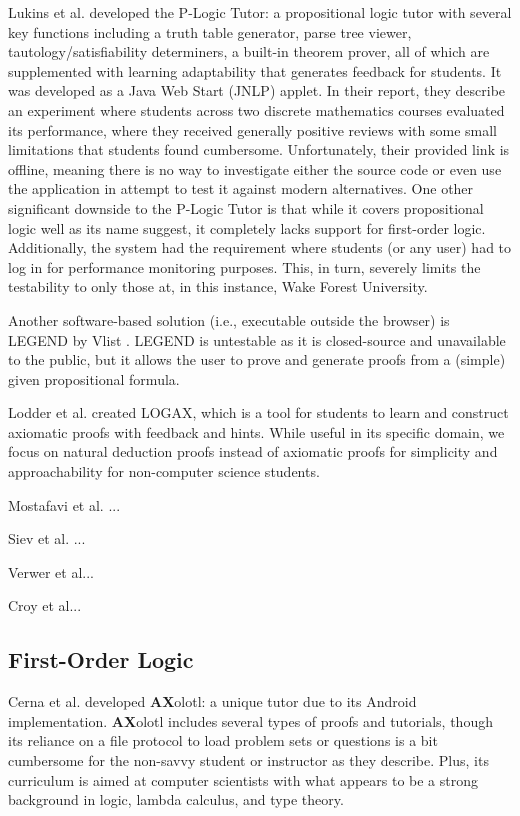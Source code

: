 \documentclass[ms]{uncgdissertationexp2}
\theoremstyle{plain}
\theoremstyle{definition}
\theoremstyle{remark}
\begin{document}
Lukins et al. \cite{lukins} developed the P-Logic Tutor: a propositional logic tutor with several key functions including a truth table generator, parse tree viewer, tautology/satisfiability determiners, a built-in theorem prover, all of which are supplemented with learning adaptability that generates feedback for students. It was developed as a Java Web Start (JNLP) applet. In their report, they describe an experiment where students across two discrete mathematics courses evaluated its performance, where they received generally positive reviews with some small limitations that students found cumbersome. Unfortunately, their provided link is offline, meaning there is no way to investigate either the source code or even use the application in attempt to test it against modern alternatives. One other significant downside to the P-Logic Tutor is that while it covers propositional logic well as its name suggest, it completely lacks support for first-order logic. Additionally, the system had the requirement where students (or any user) had to log in for performance monitoring purposes. This, in turn, severely limits the testability to only those at, in this instance, Wake Forest University. 

Another software-based solution (i.e., executable outside the browser) is LEGEND by Vlist \cite{vlist}. LEGEND is untestable as it is closed-source and unavailable to the public, but it allows the user to prove and generate proofs from a (simple) given propositional formula.

Lodder et al. \cite{lodder} created LOGAX, which is a tool for students to learn and construct axiomatic proofs with feedback and hints. While useful in its specific domain, we focus on natural deduction proofs instead of axiomatic proofs for simplicity and approachability for non-computer science students.

Mostafavi et al. \cite{mostafavi}...

Siev et al. \cite{apros}...

Verwer et al... \cite{verwer}

Croy et al... \cite{croy}

\subsection{First-Order Logic}
Cerna et al. \cite{cerna} developed \textbf{AX}olotl: a unique tutor due to its Android implementation. \textbf{AX}olotl includes several types of proofs and tutorials, though its reliance on a file protocol to load problem sets or questions is a bit cumbersome for the non-savvy student or instructor as they describe. Plus, its curriculum is aimed at computer scientists with what appears to be a strong background in logic, lambda calculus, and type theory.
\end{document}
